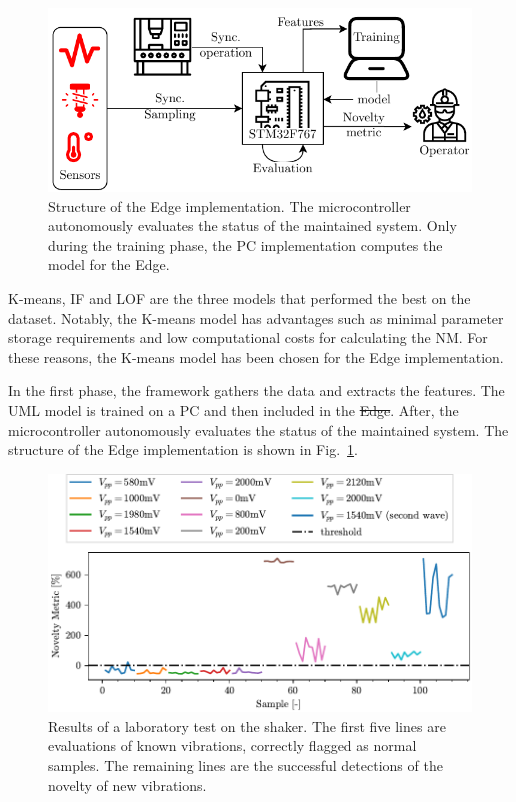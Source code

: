 \documentclass[a4paper, 10pt, conference, oneside]{ieeeconf}
\providecommand{\DIFaddtex}[1]{{\protect\color{blue}\uwave{#1}}} %
\providecommand{\DIFdeltex}[1]{{\protect\color{red}\sout{#1}}}                      %
\providecommand{\DIFaddbegin}{} %
\providecommand{\DIFaddend}{} %
\providecommand{\DIFdelbegin}{} %
\providecommand{\DIFdelend}{} %
\providecommand{\DIFadd}[1]{\texorpdfstring{\DIFaddtex{#1}}{#1}} %
\providecommand{\DIFdel}[1]{\texorpdfstring{\DIFdeltex{#1}}{}} %
\newcommand{\DIFscaledelfig}{0.5}
\newlength{\DIFdelgraphicswidth} %
\newlength{\DIFdelgraphicsheight} %
\newcommand{\DIFaddincludegraphics}[2][]{{\color{blue}\fbox{\DIFOincludegraphics[#1]{#2}}}} %
\newcommand{\DIFdelincludegraphics}[2][]{%
\sbox{\DIFdelgraphicsbox}{\DIFOincludegraphics[#1]{#2}}%
\settoboxwidth{\DIFdelgraphicswidth}{\DIFdelgraphicsbox} %
\settoboxtotalheight{\DIFdelgraphicsheight}{\DIFdelgraphicsbox} %
\scalebox{\DIFscaledelfig}{%
\parbox[b]{\DIFdelgraphicswidth}{\usebox{\DIFdelgraphicsbox}\\[-\baselineskip] \rule{\DIFdelgraphicswidth}{0em}}\llap{\resizebox{\DIFdelgraphicswidth}{\DIFdelgraphicsheight}{%
\setlength{\unitlength}{\DIFdelgraphicswidth}%
\begin{picture}(1,1)%
\thicklines\linethickness{2pt} %
{\color[rgb]{1,0,0}\put(0,0){\framebox(1,1){}}}%
{\color[rgb]{1,0,0}\put(0,0){\line( 1,1){1}}}%
{\color[rgb]{1,0,0}\put(0,1){\line(1,-1){1}}}%
\end{picture}%
}\hspace*{3pt}}} %
} %
\DeclareRobustCommand{\DIFaddbegin}{\DIFOaddbegin \let\includegraphics\DIFaddincludegraphics} %
\DeclareRobustCommand{\DIFaddend}{\DIFOaddend \let\includegraphics\DIFOincludegraphics} %
\DeclareRobustCommand{\DIFdelbegin}{\DIFOdelbegin \let\includegraphics\DIFdelincludegraphics} %
\DeclareRobustCommand{\DIFdelend}{\DIFOaddend \let\includegraphics\DIFOincludegraphics} %
\begin{document}
\begin{figure}
    \includegraphics[width=\linewidth]{images/EmbeddedStructure.pdf}
    \caption{Structure of the Edge implementation. The microcontroller autonomously evaluates the status of the maintained system. Only during the training phase, the PC implementation computes the model for the Edge.}
    \label{fig:embedded}
\end{figure}

K-means, IF and LOF are the three models that performed the best on the dataset. Notably, the K-means model has advantages such as minimal parameter storage requirements and low computational costs for calculating the NM. For these reasons, the K-means model has been chosen for the Edge implementation.

In the first phase, the framework gathers the data and extracts the features. The UML model is trained on a PC and then included in the \DIFdelbegin \DIFdel{Edge}\DIFdelend \DIFaddbegin \DIFadd{embedded application}\DIFaddend . After, the microcontroller autonomously evaluates the status of the maintained system. The structure of the Edge implementation is shown in Fig.~\ref{fig:embedded}. 

\begin{figure}
    \includegraphics[width=\linewidth]{images/Test02_LOF.pdf}
    \caption{Results of a laboratory test on the shaker. The first five lines are evaluations of known vibrations, correctly flagged as normal samples. The remaining lines are the successful detections of the novelty of new vibrations.}
    \label{fig:shaker}
\end{figure}
\end{document}
